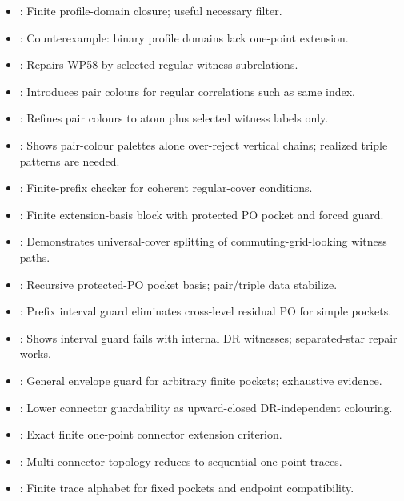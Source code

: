 \documentclass[11pt]{article}
\begin{document}
\begin{itemize}
\item {}: Finite profile-domain closure; useful necessary filter.
\item {}: Counterexample: binary profile domains lack one-point extension.
\item {}: Repairs WP58 by selected regular witness subrelations.
\item {}: Introduces pair colours for regular correlations such as same index.
\item {}: Refines pair colours to atom plus selected witness labels only.
\item {}: Shows pair-colour palettes alone over-reject vertical chains; realized triple patterns are needed.
\item {}: Finite-prefix checker for coherent regular-cover conditions.
\item {}: Finite extension-basis block with protected PO pocket and forced guard.
\item {}: Demonstrates universal-cover splitting of commuting-grid-looking witness paths.
\item {}: Recursive protected-PO pocket basis; pair/triple data stabilize.
\item {}: Prefix interval guard eliminates cross-level residual PO for simple pockets.
\item {}: Shows interval guard fails with internal DR witnesses; separated-star repair works.
\item {}: General envelope guard for arbitrary finite pockets; exhaustive evidence.
\item {}: Lower connector guardability as upward-closed DR-independent colouring.
\item {}: Exact finite one-point connector extension criterion.
\item {}: Multi-connector topology reduces to sequential one-point traces.
\item {}: Finite trace alphabet for fixed pockets and endpoint compatibility.

\end{itemize}
\end{document}
